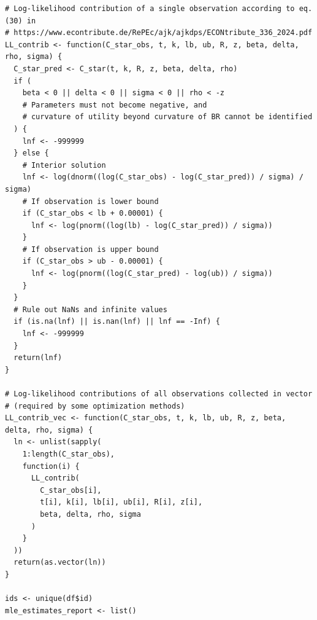 \documentclass[11pt, a4paper, oneside]{article}
\theoremstyle{Plain}
\theoremstyle{Definition}
\theoremstyle{Remark}
\begin{document}
\begin{appendix}
\begin{lstlisting}
# Log-likelihood contribution of a single observation according to eq. (30) in
# https://www.econtribute.de/RePEc/ajk/ajkdps/ECONtribute_336_2024.pdf
LL_contrib <- function(C_star_obs, t, k, lb, ub, R, z, beta, delta, rho, sigma) {
  C_star_pred <- C_star(t, k, R, z, beta, delta, rho)
  if (
    beta < 0 || delta < 0 || sigma < 0 || rho < -z
    # Parameters must not become negative, and
    # curvature of utility beyond curvature of BR cannot be identified
  ) {
    lnf <- -999999
  } else {
    # Interior solution
    lnf <- log(dnorm((log(C_star_obs) - log(C_star_pred)) / sigma) / sigma)
    # If observation is lower bound
    if (C_star_obs < lb + 0.00001) {
      lnf <- log(pnorm((log(lb) - log(C_star_pred)) / sigma))
    }
    # If observation is upper bound
    if (C_star_obs > ub - 0.00001) {
      lnf <- log(pnorm((log(C_star_pred) - log(ub)) / sigma))
    }
  }
  # Rule out NaNs and infinite values
  if (is.na(lnf) || is.nan(lnf) || lnf == -Inf) {
    lnf <- -999999
  }
  return(lnf)
}

# Log-likelihood contributions of all observations collected in vector
# (required by some optimization methods)
LL_contrib_vec <- function(C_star_obs, t, k, lb, ub, R, z, beta, delta, rho, sigma) {
  ln <- unlist(sapply(
    1:length(C_star_obs),
    function(i) {
      LL_contrib(
        C_star_obs[i],
        t[i], k[i], lb[i], ub[i], R[i], z[i],
        beta, delta, rho, sigma
      )
    }
  ))
  return(as.vector(ln))
}

ids <- unique(df$id)
mle_estimates_report <- list()


\end{lstlisting}
\end{appendix}
\end{document}
